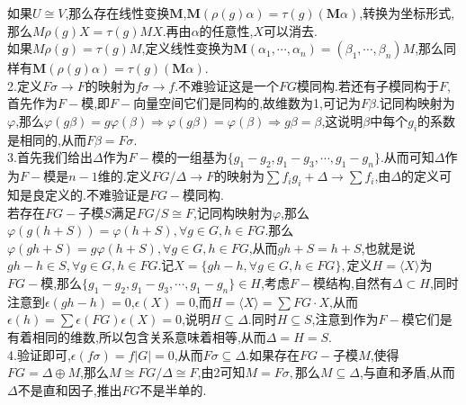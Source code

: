 \documentclass[b5paper,twoside]{ctexart}
\begin{document}
如果$U\cong V$,那么存在线性变换$\mathbf{M}$,$\mathbf{M}(\rho(g)\alpha)=\tau(g)(\mathbf{M}\alpha)$,转换为坐标形式,那么$M\rho(g)X=\tau(g)MX$.再由$\alpha$的任意性,$X$可以消去.\\
如果$M\rho(g)=\tau(g)M$,定义线性变换为$\mathbf{M}(\alpha_1,\cdots,\alpha_n)=(\beta_1,\cdots,\beta_n)M$,那么同样有$\mathbf{M}(\rho(g)\alpha)=\tau(g)(\mathbf{M}\alpha)$.\\
2.定义$F\sigma\to F$的映射为$f\sigma\to f.$不难验证这是一个$FG$模同构.若还有子模同构于$F$,首先作为$F-$模,即$F-$向量空间它们是同构的,故维数为1,可记为$F\beta$.记同构映射为$\varphi$,那么$\varphi(g\beta)=g\varphi(\beta)\Rightarrow \varphi(g\beta)=\varphi(\beta)\Rightarrow g\beta=\beta$,这说明$\beta$中每个$g_i$的系数是相同的,从而$F\beta=F\sigma$.\\
3.首先我们给出$\Delta$作为$F-$模的一组基为$\{g_1-g_2,g_1-g_3,\cdots,g_1-g_n\}$.从而可知$\Delta$作为$F-$模是$n-1$维的.定义$FG/\Delta\to F$的映射为$\sum f_ig_i+\Delta \to \sum f_i$,由$\Delta$的定义可知是良定义的.不难验证是$FG-$模同构.\\
若存在$FG-$子模$S$满足$FG/S\cong F$,记同构映射为$\varphi$,那么$\varphi(g(h+S))=\varphi(h+S),\forall g\in G,h\in FG$.那么$\varphi(gh+S)=g\varphi(h+S),\forall g\in G,h\in FG$,从而$gh+S=h+S$,也就是说$gh-h\in S,\forall g\in G,h\in FG$.记$X=\{gh-h,\forall g\in G,h\in FG\},$定义$H=\langle X \rangle$为$FG-$模,那么$\{g_1-g_2,g_1-g_3,\cdots,g_1-g_n\}\in H$,考虑$F-$模结构,自然有$\Delta\subset H$,同时注意到$\epsilon(gh-h)=0$,$\epsilon (X)=0$,而$H=\langle X \rangle=\sum FG\cdot X$,从而$\epsilon(h)=\sum\epsilon(FG)\epsilon(X)=0$,说明$H\subseteq \Delta$.同时$H\subseteq S$,注意到作为$F-$模它们是有着相同的维数,所以包含关系意味着相等,从而$\Delta=H=S$.\\
4.验证即可,$\epsilon(f\sigma)=f|G|=0$,从而$F\sigma\subseteq \Delta$.如果存在$FG-$子模$M$,使得$FG=\Delta\oplus M$,那么$M\cong FG/\Delta\cong F$,由2可知$M=F\sigma,$那么$M\subseteq \Delta$,与直和矛盾,从而$\Delta$不是直和因子,推出$FG$不是半单的.\\
\end{document}
